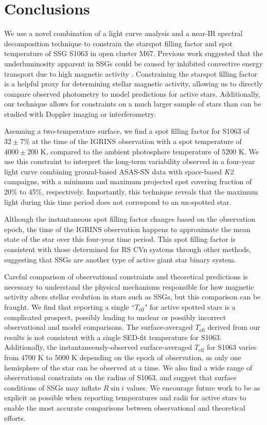 \documentclass[twocolumn,tighten]{aastex631}
\begin{document}
\section{Conclusions}
\label{sec:conclusions}

We use a novel combination of a light curve analysis and a near-IR spectral decomposition technique to constrain the starspot filling factor and spot temperature of SSG S1063 in open cluster M67. Previous work suggested that the underluminosity apparent in SSGs could be caused by inhibited convective energy transport due to high magnetic activity \citep{leiner17}. Constraining the starspot filling factor is a helpful proxy for determining stellar magnetic activity, allowing us to directly compare observed photometry to model predictions for active stars. Additionally, our technique allows for constraints on a much larger sample of stars than can be studied with Doppler imaging or interferometry.

Assuming a two-temperature surface, we find a spot filling factor for S1063 of $32\pm7$\% at the time of the IGRINS observation with a spot temperature of $4000\pm200$ K, compared to the ambient photosphere temperature of 5200 K. We use this constraint to interpret the long-term variability observed in a four-year light curve combining ground-based ASAS-SN data with space-based \emph{K2} campaigns, with a minimum and maximum projected spot covering fraction of 20\% to 45\%, respectively. Importantly, this technique reveals that the maximum light during this time period does not correspond to an un-spotted star. 

Although the instantaneous spot filling factor changes based on the observation epoch, the time of the IGRINS observation happens to approximate the mean state of the star over this four-year time period. This spot filling factor is consistent with those determined for RS CVn systems through other methods, suggesting that SSGs are another type of active giant star binary system. 

Careful comparison of observational constraints and theoretical predictions is necessary to understand the physical mechanisms responsible for how magnetic activity alters stellar evolution in stars such as SSGs, but this comparison can be fraught. We find that reporting a single ``$T_{\mathrm{eff}}$" for active spotted stars is a complicated prospect, possibly leading to unclear or possibly incorrect observational and model comparisons. The surface-averaged $T_{\mathrm{eff}}$ derived from our results is not consistent with a single SED-fit temperature for S1063. Additionally, the instantaneously-observed surface-averaged $T_{\mathrm{eff}}$ for S1063 varies from 4700 K to 5000 K depending on the epoch of observation, as only one hemisphere of the star can be observed at a time. We also find a wide range of observational constraints on the radius of S1063, and suggest that surface conditions of SSGs may inflate $R\sin{i}$ values. We encourage future work to be as explicit as possible when reporting temperatures and radii for active stars to enable the most accurate comparisons between observational and theoretical efforts. 
\end{document}
